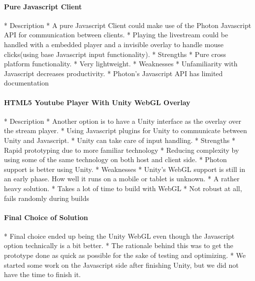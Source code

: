\paragraph{Pure Javascript Client}
    * Description
        * A pure Javascript Client could make use of the Photon Javascript API for communication between clients.
        * Playing the livestream could be handled with a embedded player and a invisible overlay to handle mouse clicks(using base Javascript input functionality). 
    * Strengths
        * Pure cross platform functionality. 
        * Very lightweight. 
    * Weaknesses
        * Unfamiliarity with Javascript decreases productivity. 
        * Photon's Javascript API has limited documentation
\paragraph{HTML5 Youtube Player With Unity WebGL Overlay}
    * Description
        * Another option is to have a Unity interface as the overlay over the stream player. 
        * Using Javascript plugins for Unity to communicate between Unity and Javascript. 
        * Unity can take care of input handling. 
    * Strengths
        * Rapid prototyping due to more familiar technology
        * Reducing complexity by using some of the same technology on both host and client side.
        * Photon support is better using Unity. 
    * Weaknesses
        * Unity's WebGL support is still in an early phase. How well it runs on a mobile or tablet is unknown. 
        * A rather heavy solution. 
        * Takes a lot of time to build with WebGL
            * Not robust at all, fails randomly during builds
\paragraph{Final Choice of Solution}
    * Final choice ended up being the Unity WebGL even though the Javascript option technically is a bit better.
        * The rationale behind this was to get the prototype done as quick as possible for the sake of testing and optimizing. 
        * We started some work on the Javascript side after finishing Unity, but we did not have the time to finish it. 
